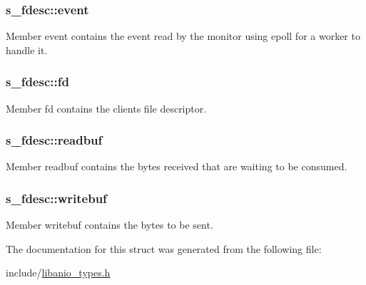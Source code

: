 \subsubsection[{event}]{\setlength{\rightskip}{0pt plus 5cm}s\+\_\+fdesc\+::event}\label{structs__fdesc_ad68cecdfd8e6cc9a0248f79b3e46a393}
Member \textquotesingle{}event\textquotesingle{} contains the event read by the monitor using epoll for a worker to handle it. \hypertarget{structs__fdesc_a6384ba385a5cf09c6a58bfffe248c257}{}
\subsubsection[{fd}]{\setlength{\rightskip}{0pt plus 5cm}s\+\_\+fdesc\+::fd}\label{structs__fdesc_a6384ba385a5cf09c6a58bfffe248c257}
Member \textquotesingle{}fd\textquotesingle{} contains the client\textquotesingle{}s file descriptor. \hypertarget{structs__fdesc_a387ee6fc84c44f17f50b31ce0f435862}{}
\subsubsection[{readbuf}]{\setlength{\rightskip}{0pt plus 5cm}s\+\_\+fdesc\+::readbuf}\label{structs__fdesc_a387ee6fc84c44f17f50b31ce0f435862}
Member \textquotesingle{}readbuf\textquotesingle{} contains the bytes received that are waiting to be consumed. \hypertarget{structs__fdesc_a41f8341d38c99becf10870a1b77655f9}{}
\subsubsection[{writebuf}]{\setlength{\rightskip}{0pt plus 5cm}s\+\_\+fdesc\+::writebuf}\label{structs__fdesc_a41f8341d38c99becf10870a1b77655f9}
Member \textquotesingle{}writebuf\textquotesingle{} contains the bytes to be sent. 

The documentation for this struct was generated from the following file\+:\begin{DoxyCompactItemize}
\item 
include/\hyperlink{libanio__types_8h}{libanio\+\_\+types.\+h}\end{DoxyCompactItemize}
